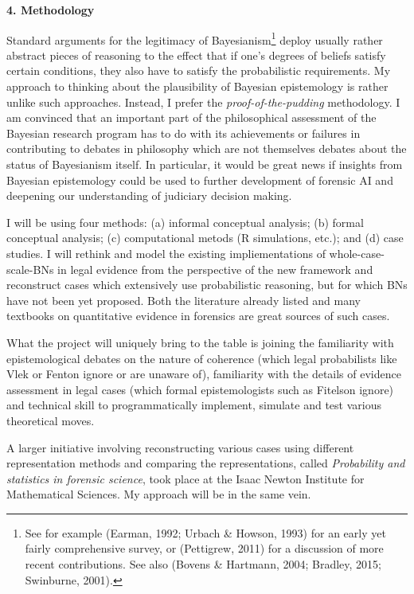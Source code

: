 \documentclass[11pt,dvipsnames,enabledeprecatedfontcommands]{scrartcl}
\begin{document}
\vspace{2mm}

\pagebreak 

\noindent \Large \textbf{4. Methodology}

\vspace{1mm} \normalsize

Standard arguments for the legitimacy of Bayesianism\footnote{See for
  example (Earman, 1992; Urbach \& Howson, 1993) for an early yet fairly
  comprehensive survey, or (Pettigrew, 2011) for a discussion of more
  recent contributions. See also (Bovens \& Hartmann, 2004; Bradley,
  2015; Swinburne, 2001).} deploy usually rather abstract pieces of
reasoning to the effect that if one's degrees of beliefs satisfy certain
conditions, they also have to satisfy the probabilistic requirements. My
approach to thinking about the plausibility of Bayesian epistemology is
rather unlike such approaches. Instead, I prefer the
\emph{proof-of-the-pudding} methodology. I am convinced that an
important part of the philosophical assessment of the Bayesian research
program has to do with its achievements or failures in contributing to
debates in philosophy which are not themselves debates about the status
of Bayesianism itself. In particular, it would be great news if insights
from Bayesian epistemology could be used to further development of
forensic AI and deepening our understanding of judiciary decision
making.

I will be using four methods: (a) informal conceptual analysis; (b)
formal conceptual analysis; (c) computational metods (R simulations,
etc.); and (d) case studies. I will rethink and model the existing
impliementations of whole-case-scale-BNs in legal evidence from the
perspective of the new framework and reconstruct cases which extensively
use probabilistic reasoning, but for which BNs have not been yet
proposed. Both the literature already listed and many textbooks on
quantitative evidence in forensics are great sources of such cases.

What the project will uniquely bring to the table is joining the
familiarity with epistemological debates on the nature of coherence
(which legal probabilists like Vlek or Fenton ignore or are unaware of),
familiarity with the details of evidence assessment in legal cases
(which formal epistemologists such as Fitelson ignore) and technical
skill to programmatically implement, simulate and test various
theoretical moves.

A larger initiative involving reconstructing various cases using
different representation methods and comparing the representations,
called \emph{Probability and statistics in forensic science}, took place
at the Isaac Newton Institute for Mathematical Sciences. My approach
will be in the same vein.
\end{document}
